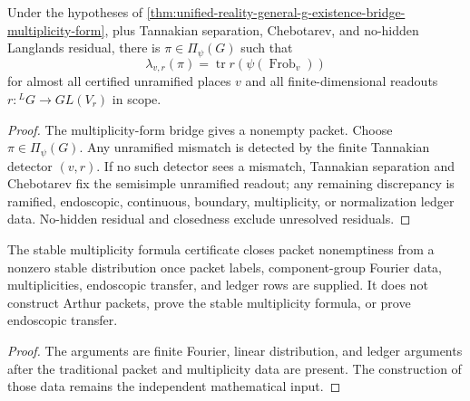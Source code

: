 \begin{theorem}
\label{thm:unified-reality-stable-multiplicity-reciprocity}
Under the hypotheses of
\autoref{thm:unified-reality-general-g-existence-bridge-multiplicity-form},
plus Tannakian separation, Chebotarev, and no-hidden Langlands residual,
there is $\pi\in\Pi_\psi(G)$ such that
$$
\lambda_{v,r}(\pi)
=
\operatorname{tr}r(\psi(\operatorname{Frob}_v))
$$
for almost all certified unramified places $v$ and all
finite-dimensional readouts $r:{}^LG\to GL(V_r)$ in scope.
\end{theorem}
\begin{proof}
The multiplicity-form bridge gives a nonempty packet. Choose
$\pi\in\Pi_\psi(G)$. Any unramified mismatch is detected by the finite
Tannakian detector $(v,r)$. If no such detector sees a mismatch,
Tannakian separation and Chebotarev fix the semisimple unramified
readout; any remaining discrepancy is ramified, endoscopic, continuous,
boundary, multiplicity, or normalization ledger data. No-hidden residual
and closedness exclude unresolved residuals.
\end{proof}

\begin{theorem}
\label{thm:unified-reality-stable-multiplicity-certificate-boundary}
The stable multiplicity formula certificate closes packet nonemptiness
from a nonzero stable distribution once packet labels, component-group
Fourier data, multiplicities, endoscopic transfer, and ledger rows are
supplied. It does not construct Arthur packets, prove the stable
multiplicity formula, or prove endoscopic transfer.
\end{theorem}
\begin{proof}
The arguments are finite Fourier, linear distribution, and ledger
arguments after the traditional packet and multiplicity data are
present. The construction of those data remains the independent
mathematical input.
\end{proof}
